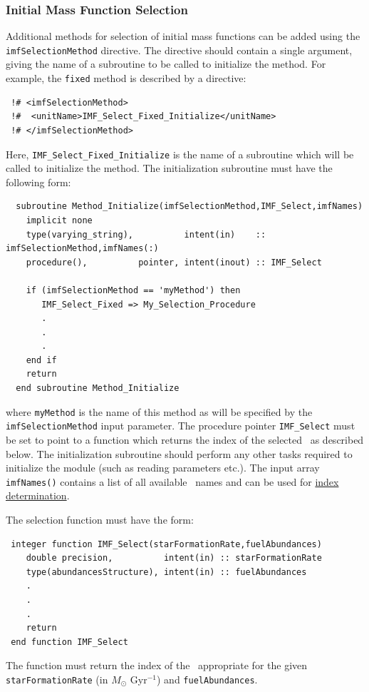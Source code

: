\subsubsection{Initial Mass Function Selection}

Additional methods for selection of initial mass functions can be added using the {\tt imfSelectionMethod} directive. The directive should contain a single argument, giving the name of a subroutine to be called to initialize the method. For example, the {\tt fixed} method is described by a directive:
\begin{verbatim}
 !# <imfSelectionMethod>
 !#  <unitName>IMF_Select_Fixed_Initialize</unitName>
 !# </imfSelectionMethod>
\end{verbatim}
Here, {\tt IMF\_Select\_Fixed\_Initialize} is the name of a subroutine which will be called to initialize the method. The initialization subroutine must have the following form:
\begin{verbatim}
  subroutine Method_Initialize(imfSelectionMethod,IMF_Select,imfNames)
    implicit none
    type(varying_string),          intent(in)    :: imfSelectionMethod,imfNames(:)
    procedure(),          pointer, intent(inout) :: IMF_Select

    if (imfSelectionMethod == 'myMethod') then
       IMF_Select_Fixed => My_Selection_Procedure
       .
       .
       .
    end if
    return
  end subroutine Method_Initialize
\end{verbatim}
where {\tt myMethod} is the name of this method as will be specified by the {\tt imfSelectionMethod} input parameter. The procedure pointer {\tt IMF\_Select} must be set to point to a function which returns the index of the selected \IMF\ as described below. The initialization subroutine should perform any other tasks required to initialize the module (such as reading parameters etc.). The input array {\tt imfNames()} contains a list of all available \IMF\ names and can be used for \hyperlink{star_formation.IMF.utilities.F90:star_formation_imf_utilities:imf_index_lookup}{index determination}.

The selection function must have the form:
\begin{verbatim}
 integer function IMF_Select(starFormationRate,fuelAbundances)
    double precision,          intent(in) :: starFormationRate
    type(abundancesStructure), intent(in) :: fuelAbundances
    .
    .
    .
    return
 end function IMF_Select
\end{verbatim}
The function must return the index of the \IMF\ appropriate for the given {\tt starFormationRate} (in $M_\odot$ Gyr$^{-1}$) and {\tt fuelAbundances}.

